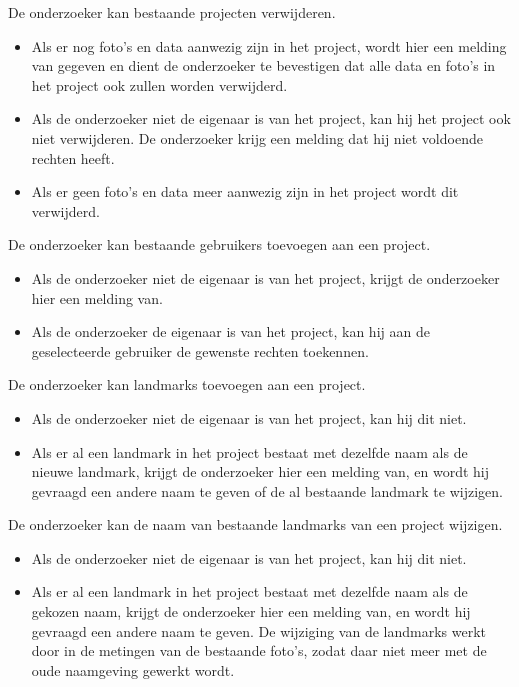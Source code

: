De onderzoeker kan bestaande projecten verwijderen.
\begin{itemize}
	\item Als er nog foto's en data aanwezig zijn in het project, wordt hier een melding van gegeven en dient de onderzoeker te bevestigen dat alle data en foto's in het project ook zullen worden verwijderd.
	\item Als de onderzoeker niet de eigenaar is van het project, kan hij het project ook niet verwijderen. De onderzoeker krijg een melding dat hij niet voldoende rechten heeft.
	\item Als er geen foto's en data meer aanwezig zijn in het project wordt dit verwijderd.
\end{itemize}

De onderzoeker kan bestaande gebruikers toevoegen aan een project.
\begin{itemize}
	\item Als de onderzoeker niet de eigenaar is van het project, krijgt de onderzoeker hier een melding van.
	\item Als de onderzoeker de eigenaar is van het project, kan hij aan de geselecteerde gebruiker de gewenste rechten toekennen.
\end{itemize}

De onderzoeker kan landmarks toevoegen aan een project.
\begin{itemize}
	\item Als de onderzoeker niet de eigenaar is van het project, kan hij dit niet.
	\item Als er al een landmark in het project bestaat met dezelfde naam als de nieuwe landmark, krijgt de onderzoeker hier een melding van, en wordt hij gevraagd een andere naam te geven of de al bestaande landmark te wijzigen.
\end{itemize}

De onderzoeker kan de naam van bestaande landmarks van een project wijzigen.
\begin{itemize}
	\item Als de onderzoeker niet de eigenaar is van het project, kan hij dit niet.
	\item Als er al een landmark in het project bestaat met dezelfde naam als de gekozen naam, krijgt de onderzoeker hier een melding van, en wordt hij gevraagd een andere naam te geven. De wijziging van de landmarks werkt door in de metingen van de bestaande foto's, zodat daar niet meer met de oude naamgeving gewerkt wordt.
\end{itemize}

